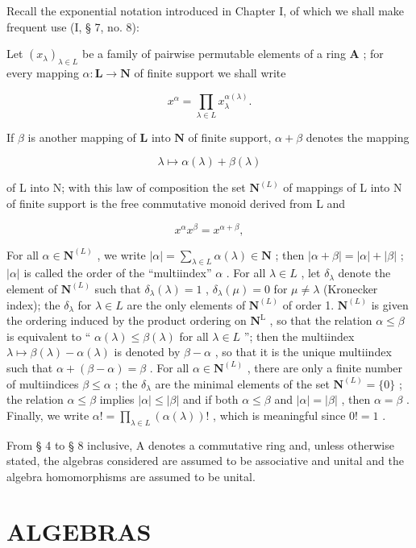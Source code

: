Recall the exponential notation introduced in Chapter I, of which we shall make frequent use (I, § 7, no. 8):

Let \((x_{\lambda})_{\lambda \in L}\) be a family of pairwise permutable elements of a ring \(\mathbf{A}\) ; for every mapping \(\alpha: \mathbf{L} \to \mathbf{N}\) of finite support we shall write

\[
x ^ {\alpha} = \prod_ {\lambda \in L} x _ {\lambda} ^ {\alpha (\lambda)}.
\]

If \(\beta\) is another mapping of \(\mathbf{L}\) into \(\mathbf{N}\) of finite support, \(\alpha + \beta\) denotes the mapping

\[
\lambda \mapsto \alpha (\lambda) + \beta (\lambda)
\]

of L into N; with this law of composition the set \(\mathbf{N}^{(L)}\) of mappings of L into N of finite support is the free commutative monoid derived from L and

\[
x ^ {\alpha} x ^ {\beta} = x ^ {\alpha + \beta},
\]

For all \(\alpha \in \mathbf{N}^{(L)}\) , we write \(|\alpha| = \sum_{\lambda \in L} \alpha(\lambda) \in \mathbf{N}\) ; then \(|\alpha + \beta| = |\alpha| + |\beta|\) ; \(|\alpha|\) is called the order of the ``multiindex'' \(\alpha\) . For all \(\lambda \in L\) , let \(\delta_{\lambda}\) denote the element of \(\mathbf{N}^{(L)}\) such that \(\delta_{\lambda}(\lambda) = 1\) , \(\delta_{\lambda}(\mu) = 0\) for \(\mu \neq \lambda\) (Kronecker index); the \(\delta_{\lambda}\) for \(\lambda \in L\) are the only elements of \(\mathbf{N}^{(L)}\) of order 1. \(\mathbf{N}^{(L)}\) is given the ordering induced by the product ordering on \(\mathbf{N}^{\mathrm{L}}\) , so that the relation \(\alpha \leqslant \beta\) is equivalent to `` \(\alpha(\lambda) \leqslant \beta(\lambda)\) for all \(\lambda \in L\) ''; then the multiindex \(\lambda \mapsto \beta(\lambda) - \alpha(\lambda)\) is denoted by \(\beta - \alpha\) , so that it is the unique multiindex such that \(\alpha + (\beta - \alpha) = \beta\) . For all \(\alpha \in \mathbf{N}^{(L)}\) , there are only a finite number of multiindices \(\beta \leqslant \alpha\) ; the \(\delta_{\lambda}\) are the minimal elements of the set \(\mathbf{N}^{(L)} = \{0\}\) ; the relation \(\alpha \leqslant \beta\) implies \(|\alpha| \leqslant |\beta|\) and if both \(\alpha \leqslant \beta\) and \(|\alpha| = |\beta|\) , then \(\alpha = \beta\) . Finally, we write \(\alpha! = \prod_{\lambda \in L} (\alpha(\lambda))!\) , which is meaningful since \(0! = 1\) .

From § 4 to § 8 inclusive, A denotes a commutative ring and, unless otherwise stated, the algebras considered are assumed to be associative and unital and the algebra homomorphisms are assumed to be unital.

\section{ALGEBRAS}
